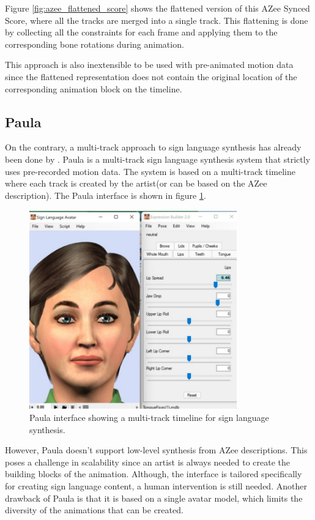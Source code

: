 \documentclass[../../main.tex]{subfiles}
\begin{document}
Figure \ref{fig:azee_flattened_score} shows the flattened version of this AZee Synced Score, where all the tracks are merged into a single track. This flattening is done by collecting all the constraints for each frame and applying them to the corresponding bone rotations during animation.

This approach is also inextensible to be used with pre-animated motion data since the flattened representation does not contain the original location of the corresponding animation block on the timeline. 

\subsection{Paula}
\label{ch:multi_track:related_work:paula}

On the contrary, a multi-track approach to sign language synthesis has already been done by \cite{todo}. Paula is a multi-track sign language synthesis system that strictly uses pre-recorded motion data. The system is based on a multi-track timeline where each track is created by the artist(or can be based on the AZee description). The Paula interface is shown in figure \ref{fig:paula}.

\begin{figure}[h]
    \centering
    \includegraphics[width=0.8\textwidth]{chapters/multi_track/images/paula.png}
    \caption{Paula interface showing a multi-track timeline for sign language synthesis.}
    \label{fig:paula}
\end{figure}

However, Paula doesn't support low-level synthesis from AZee descriptions. This poses a challenge in scalability since an artist is always needed to create the building blocks of the animation. Although, the interface is tailored specifically for creating sign language content, a human intervention is still needed. Another drawback of Paula is that it is based on a single avatar model, which limits the diversity of the animations that can be created.
\end{document}
